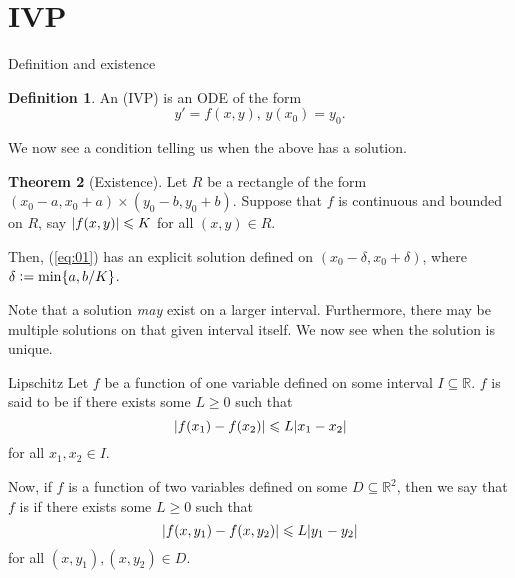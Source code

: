 \documentclass[dvipsnames, handout]{beamer}
\theoremstyle{definition}
\newtheorem{thm}{Theorem}
\newtheorem{defn}[thm]{Definition}
\let\subset\subseteq
\let\ge\geqslant
\let\le\leqslant
\begin{document}
\section{IVP}
\begin{frame}{Definition and existence}
  \begin{defn}
    An  (IVP) is an ODE of the form
    \begin{equation} \label{eq:01}
      y' = f(x, y),\, y(x_{0}) = y_{0}.
    \end{equation}
  \end{defn} \pause
  We now see a condition telling us when the above has a solution. \pause

  \begin{thm}[Existence]
    Let $R$ be a rectangle of the form $(x_{0} - a, x_{0} + a) \times (y_{0} - b, y_{0} + b)$. \pause Suppose that $f$ is continuous and bounded on $R$, \pause say $\md{f(x, y)} \le K$ for all $(x, y) \in R$. \pause

    Then, (\ref{eq:01}) has an explicit solution defined on $(x_{0} - \delta, x_{0} + \delta)$, \pause where $\delta \vcentcolon= \min\{a, b/K\}$. \pause
  \end{thm}
  Note that a solution \emph{may} exist on a larger interval. \pause Furthermore, there may be multiple solutions on that given interval itself. \pause We now see when the solution is unique.
\end{frame}
\begin{frame}{Lipschitz}
  Let $f$ be a function of one variable defined on some interval $I \subset \mathbb{R}$. \pause $f$ is said to be  \pause if there exists some $L \ge 0$ \pause such that
  \begin{equation*} 
    \md{f(x_{1}) - f(x_{2})} \le L \md{x_{1} - x_{2}}
  \end{equation*}
  for all $x_{1}, x_{2} \in I$. \pause

  Now, if $f$ is a function of two variables defined on some $D \subset \mathbb{R}^{2}$, \pause then we say that $f$ is  if \pause there exists some $L \ge 0$ \pause such that
  \begin{equation*} 
    \md{f(x, y_{1}) - f(x, y_{2})} \le L \md{y_{1} - y_{2}}
  \end{equation*}
  for all $(x, y_{1}), (x, y_{2}) \in D$. \pause
\end{frame}
\end{document}
